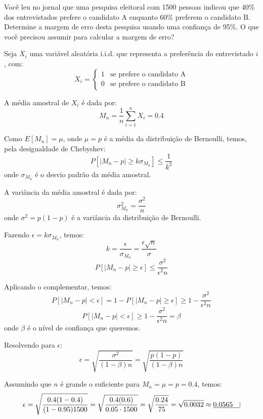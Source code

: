 \documentclass[12 pt]{article}
\begin{document}
Você leu no jornal que uma pesquisa eleitoral com 1500 pessoas indicou que 40\% dos entrevistados prefere o candidato A enquanto 60\% preferem o candidato B. Determine a margem de erro desta pesquisa usando uma confiança de 95\%. O que você precisou assumir para calcular a margem de erro?
\begin{tcolorbox}[colframe=black, title=Resposta:]
    Seja $X_i$ uma variável aleatória i.i.d. que representa a preferência do entrevistado $i$, com:
    $$
    X_i = \begin{cases}
    1 & \text{se prefere o candidato A} \\
    0 & \text{se prefere o candidato B}
    \end{cases}
    $$
    
    A média amostral de $X_i$ é dada por:
    $$
    M_n = \frac{1}{n}\sum_{i=1}^n X_i =  0.4
    $$

    Como $E[M_n] = \mu$, onde $\mu=p$ é a média da distribuição de Bernoulli, temos, pela desigualdade de Chebyshev:
    $$
    P[|M_n - p| \geq k \sigma_{M_n}] \leq \frac{1}{k^2}
    $$
    onde $\sigma_{M_n}$ é o desvio padrão da média amostral. 
    
    A variância da média amostral é dada por:
    $$
    \sigma_{M_n}^2 = \frac{\sigma^2}{n}
    $$
    onde $\sigma^2 = p(1-p)$ é a variância da distribuição de Bernoulli.

    Fazendo $\epsilon = k \sigma_{M_n}$, temos:
    $$
    k=\frac{\epsilon}{\sigma_{M_n}} = \frac{\epsilon\sqrt{n}}{\sigma}
    $$
    $$
    P[|M_n - p| \geq \epsilon] \leq \frac{\sigma^2}{\epsilon^2n}
    $$

    Aplicando o complementar, temos:
    $$
    P[|M_n - p| < \epsilon] = 1 - P[|M_n - p| \geq \epsilon] \geq 1 - \frac{\sigma^2}{\epsilon^2n}
    $$
    $$
    P[|M_n - p| < \epsilon] \geq 1 - \frac{\sigma^2}{\epsilon^2n}=\beta
    $$
    onde $\beta$ é o nível de confiança que queremos.
\end{tcolorbox}

\begin{tcolorbox}[colframe=black, title=Resposta:]
    Resolvendo para $\epsilon$:
    $$
    \epsilon = \sqrt{\frac{\sigma^2}{(1-\beta)n}} = \sqrt{\frac{p(1-p)}{(1-\beta)n}}
    $$

    Assumindo que $n$ é grande o suficiente para $M_n=\mu=p=0.4$, temos:
    $$
    \epsilon = \sqrt{\frac{0.4(1-0.4)}{(1-0.95)1500}} = \sqrt{\frac{0.4(0.6)}{0.05\cdot1500}} = \sqrt{\frac{0.24}{75}} = \sqrt{0.0032} \approx \underline{0.0565 \quad \vline}
    $$
\end{tcolorbox}
\end{document}
